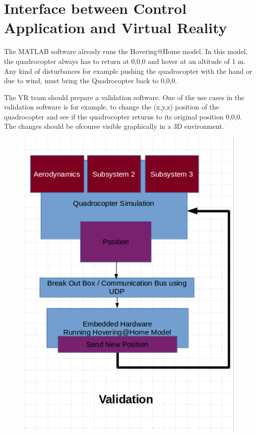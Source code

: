 \documentclass[a4paper,11pt]{article}
\begin{document}
\pagebreak

\section{Interface between Control Application and Virtual Reality}

The MATLAB software already runs the Hovering@Home model. In this model, the quadrocopter always has to return at 0,0,0 and hover at an altitude of 1 m. Any kind of disturbances for example pushing the quadrocopter with the hand or due to wind, must bring the Quadrocopter back to 0,0,0.

The VR team should prepare a validation software. One of the use cases in the validation software is for example, to change the (x,y,z) position of the quadrocopter and see if the quadrocopter returns to its original position 0,0,0.
The changes should be ofcourse visible graphically in a 3D environment.

\begin{figure}[ht]
\centering
\includegraphics[scale=0.5]{pics/Interface-Control-VR.png}
\end{figure}
\end{document}
